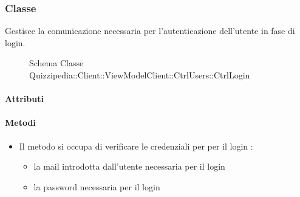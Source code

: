 \subsubsection{Classe }
Gestisce la comunicazione necessaria per l'autenticazione dell'utente in fase di login.
\begin{figure}[H]
\centering
\noindent{}
\caption[Schema Classe CtrlLogin]{Schema Classe Quizzipedia::Client::ViewModelClient::CtrlUsers::CtrlLogin}
\end{figure}
\paragraph{Attributi}
\paragraph{Metodi}
\begin{itemize}
\item {}
\newline
Il metodo si occupa di verificare le credenziali per per il login
\newline
{} :
\begin{itemize}
\item {}
\newline
la mail introdotta dall'utente necessaria per il login
\item {}
\newline
la password necessaria per il login
\end{itemize}
\end{itemize}
